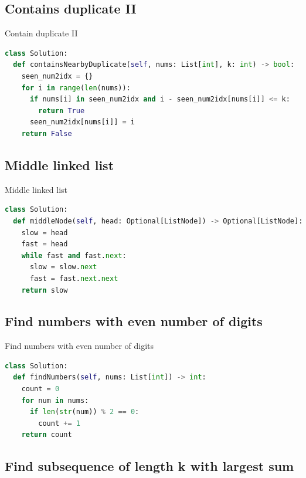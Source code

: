 \documentclass[a4paper,12pt]{article}
\begin{document}
\begin{multicols}{2}
\subsection{Contains duplicate II}

\begin{mycode}[label={lst:contains-duplicate-ii}]{Contain duplicate II}
\begin{lstlisting}[language=Python]
class Solution:
  def containsNearbyDuplicate(self, nums: List[int], k: int) -> bool:
    seen_num2idx = {}
    for i in range(len(nums)):
      if nums[i] in seen_num2idx and i - seen_num2idx[nums[i]] <= k:
        return True
      seen_num2idx[nums[i]] = i
    return False
\end{lstlisting}
\end{mycode}

\subsection{Middle linked list}

\begin{mycode}[label={lst:middle-linked-list}]{Middle linked list}
\begin{lstlisting}[language=Python]
class Solution:
  def middleNode(self, head: Optional[ListNode]) -> Optional[ListNode]:
    slow = head
    fast = head
    while fast and fast.next:
      slow = slow.next
      fast = fast.next.next
    return slow
\end{lstlisting}
\end{mycode}

\subsection{Find numbers with even number of digits}

\begin{mycode}[label={lst:find-numbers}]{Find numbers with even number of digits}
\begin{lstlisting}[language=Python]
class Solution:
  def findNumbers(self, nums: List[int]) -> int:
    count = 0
    for num in nums:
      if len(str(num)) % 2 == 0:
        count += 1
    return count
\end{lstlisting}
\end{mycode}

\subsection{Find subsequence of length k with largest sum}


\end{multicols}
\end{document}
